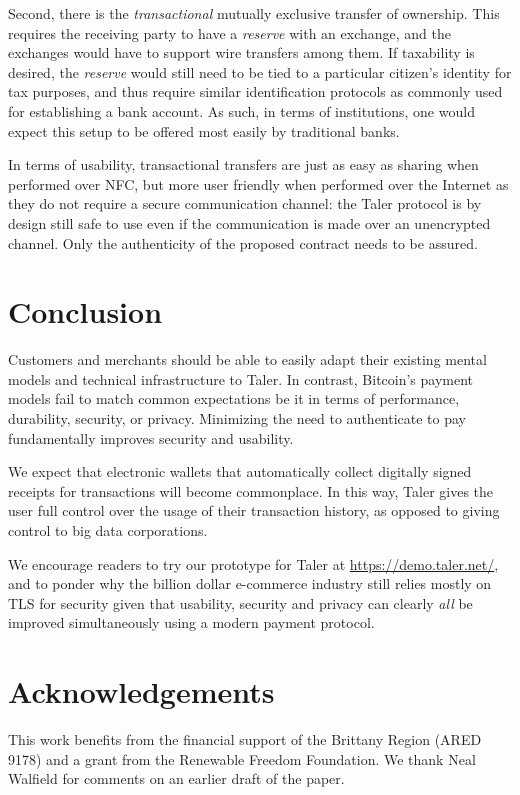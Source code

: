 \documentclass{llncs}
\begin{document}
Second, there is the {\em transactional} mutually exclusive transfer
of ownership.  This requires the receiving party to have a {\em
reserve} with an exchange, and the exchanges would have to support
wire transfers among them.  If taxability is desired, the {\em
reserve} would still need to be tied to a particular citizen's
identity for tax purposes, and thus require similar identification
protocols as commonly used for establishing a bank account.  As such, in
terms of institutions, one would expect this setup to be offered most
easily by traditional banks.

In terms of usability, transactional
transfers are just as easy as sharing when performed over NFC, but
more user friendly when performed over the Internet as they do not
require a secure communication channel: the Taler protocol is by
design still safe to use even if the communication is made over an
unencrypted channel. Only the authenticity of the proposed contract
needs to be assured.



\section{Conclusion}

Customers and merchants should be able to easily adapt their existing
mental models and technical infrastructure to Taler.  In contrast,
Bitcoin's payment models fail to match common expectations be it in
terms of performance, durability, security, or privacy.  Minimizing
the need to authenticate to pay fundamentally improves security
and usability.

We expect that electronic wallets that automatically collect digitally
signed receipts for transactions will become commonplace.
In this way, Taler gives the user full control over the usage of their
transaction history, as opposed to giving control to big data corporations.

We encourage readers to try our prototype for Taler
at \url{https://demo.taler.net/}, and to ponder why the billion dollar
e-commerce industry still relies mostly on TLS for security given
that usability, security and privacy can clearly {\em all} be improved
simultaneously using a modern payment protocol.


\section*{Acknowledgements}

This work benefits from the financial support of the Brittany Region
(ARED 9178) and a grant from the Renewable Freedom Foundation.  We
thank Neal Walfield for comments on an earlier draft of the paper.



\end{document}
